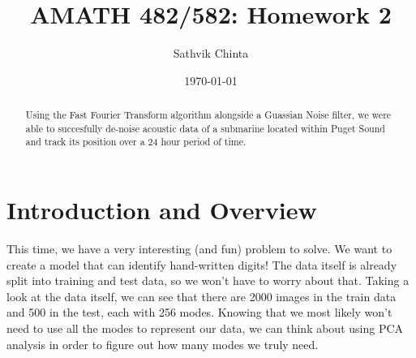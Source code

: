 \documentclass[11pt]{amsart}
\title{AMATH 482/582: Homework 2}
\author{Sathvik Chinta} %
\date{\today} %
\begin{document}
\maketitle 

\begin{abstract}
    Using the Fast Fourier Transform algorithm alongside a Guassian Noise filter, we were able to succesfully
    de-noise acoustic data of a submarine located within Puget Sound and track its position over a 24 hour
    period of time. 
\end{abstract}


\section{Introduction and Overview}\label{sec:Introduction}
This time, we have a very interesting (and fun) problem to solve. We want to create a model that can identify hand-written digits!
The data itself is already split into training and test data, so we won't have to worry about that. Taking a look at the data itself, 
we can see that there are 2000 images in the train data and 500 in the test, each with 256 modes. Knowing that we most likely won't need to use 
all the modes to represent our data, we can think about using PCA analysis in order to figure out how many modes we truly need.



\end{document}
